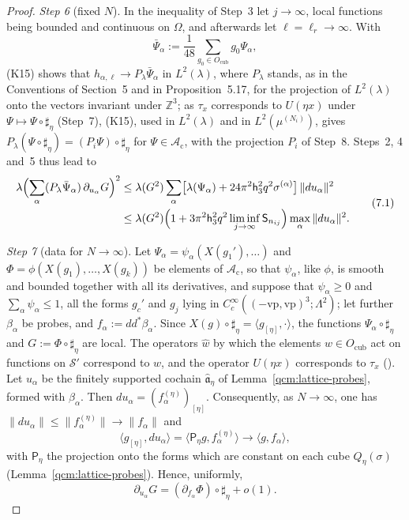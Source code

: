 \documentclass[11pt,letterpaper,reqno]{amsart}
\theoremstyle{definition}
\begin{document}
\begin{proof}
\emph{Step 6} (fixed $N$).
In the inequality of Step~3 let $j\to\infty$, local functions being bounded and continuous on $\Omega$, and afterwards let $\ell=\ell_r\to\infty$.
With
\begin{equation*}
\bar\Psi_\alpha:=\frac1{48}\sum_{g_0\in O_{\mathrm{cub}}}g_0\Psi_\alpha,
\end{equation*}
(K15) shows that $h_{\alpha,\ell}\to P_\lambda\bar\Psi_\alpha$ in $L^2(\lambda)$, where $P_\lambda$ stands, as in the Conventions of Section~5 and in Proposition~5.17, for the projection of $L^2(\lambda)$ onto the vectors invariant under $\mathbb Z^3$;
as $\tau_x$ corresponds to $U(\eta x)$ under $\Psi\mapsto\Psi\circ\sharp_\eta$ (Step~7), (K15), used in $L^2(\lambda)$ and in $L^2(\mu^{(N_i)})$, gives $P_\lambda(\Psi\circ\sharp_\eta)=(P_i\Psi)\circ\sharp_\eta$ for $\Psi\in\mathcal A_{\mathrm c}$, with the projection $P_i$ of Step~8.
Steps~2, 4 and~5 thus lead to
\begin{equation}
\begin{split}
\lambda\Bigl(\sum_\alpha(P_\lambda\bar\Psi_\alpha)\,\partial_{u_\alpha}G\Bigr)^2
&\le\lambda(G^2)\sum_\alpha\bigl[\lambda(\Psi_\alpha)+24\pi^2\mathsf h_3^2q^2\sigma^{(\alpha)}\bigr]\,\|du_\alpha\|^2\\
&\le\lambda(G^2)\Bigl(1+3\pi^2\mathsf h_3^2q^2\liminf_{j\to\infty}\mathsf S_{n_{ij}}\Bigr)\max_\alpha\|du_\alpha\|^2.
\end{split}
\tag{7.1}\label{eq:weighted-lattice}
\end{equation}

\emph{Step 7} (data for $N\to\infty$).
Let $\Psi_\alpha=\psi_\alpha(X(g_1'),\dots)$ and $\Phi=\phi(X(g_1),\dots,X(g_k))$ be elements of $\mathcal A_{\mathrm c}$, so that $\psi_\alpha$, like $\phi$, is smooth and bounded together with all its derivatives, and suppose that $\psi_\alpha\ge0$ and $\sum_\alpha\psi_\alpha\le1$,
all the forms $g_c'$ and $g_j$ lying in $C_c^\infty((-\mathrm{vp},\mathrm{vp})^3;\Lambda^2)$;
let further $\beta_\alpha$ be probes, and $f_\alpha:=dd^*\beta_\alpha$.
Since $X(g)\circ\sharp_\eta=\langle g_{[\eta]},\cdot\rangle$, the functions $\Psi_\alpha\circ\sharp_\eta$ and $G:=\Phi\circ\sharp_\eta$ are local.
The operators $\hat w$ by which the elements $w\in O_{\mathrm{cub}}$ act on functions on $\mathcal S'$ correspond to $w$, and the operator $U(\eta x)$ corresponds to $\tau_x$ (\cite[equation~(6.9)]{QEDConstruction}).
Let $u_\alpha$ be the finitely supported cochain $\widehat{\mathfrak a}_\eta$ of Lemma~\ref{qcm:lattice-probes}, formed with $\beta_\alpha$. Then $du_\alpha=(f_\alpha^{(\eta)})_{[\eta]}$.
Consequently, as $N\to\infty$, one has $\|du_\alpha\|\le\|f_\alpha^{(\eta)}\|\to\|f_\alpha\|$ and
\begin{equation*}
\langle g_{[\eta]},du_\alpha\rangle=\langle\mathsf P_\eta g,f_\alpha^{(\eta)}\rangle\to\langle g,f_\alpha\rangle,
\end{equation*}
with $\mathsf P_\eta$ the projection onto the forms which are constant on each cube $Q_\eta(\sigma)$ (Lemma~\ref{qcm:lattice-probes}).
Hence, uniformly,
\begin{equation*}
\partial_{u_\alpha}G=(\partial_{f_\alpha}\Phi)\circ\sharp_\eta+o(1).
\end{equation*}


\end{proof}
\end{document}
